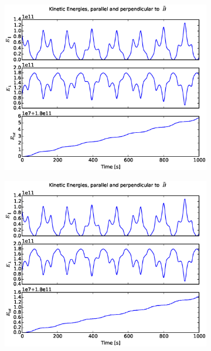 \documentclass[x11names]{article}
\begin{document}
\begin{figure}
\begin{subfigure}{0.45\textwidth}
        \includegraphics[width = \textwidth]{figures/ion_8_5_Eulerenergy}
      \end{subfigure}
      \begin{subfigure}{0.45\textwidth}
        \includegraphics[width = \textwidth]{figures/ion_8_5_Verletenergy}
      \end{subfigure} 
      \begin{subfigure}{0.45\textwidth}

\end{subfigure}
\end{figure}
\end{document}
